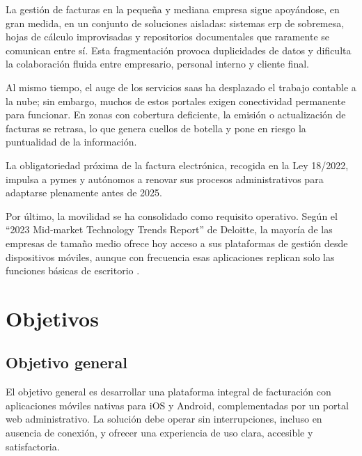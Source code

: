 \begin{large}

La gestión de facturas en la pequeña y mediana empresa sigue apoyándose, en gran medida, en un conjunto de soluciones aisladas: sistemas \gls{erp} de sobremesa, hojas de cálculo improvisadas y repositorios documentales que raramente se comunican entre sí. Esta fragmentación provoca duplicidades de datos y dificulta la colaboración fluida entre empresario, personal interno y cliente final.

Al mismo tiempo, el auge de los servicios \gls{saas} ha desplazado el trabajo contable a la nube; sin embargo, muchos de estos portales exigen conectividad permanente para funcionar. En zonas con cobertura deficiente, la emisión o actualización de facturas se retrasa, lo que genera cuellos de botella y pone en riesgo la puntualidad de la información.

La obligatoriedad próxima de la factura electrónica, recogida en la Ley 18/2022, impulsa a pymes y autónomos a renovar sus procesos administrativos para adaptarse plenamente antes de 2025.

Por último, la movilidad se ha consolidado como requisito operativo. Según el \enquote{2023 Mid‐market Technology Trends Report} de Deloitte, la mayoría de las empresas de tamaño medio ofrece hoy acceso a sus plataformas de gestión desde dispositivos móviles, aunque con frecuencia esas aplicaciones replican solo las funciones básicas de escritorio \cite{estudio_movilidad}.

\end{large}

\section{Objetivos}

\subsection{Objetivo general}

\begin{large}

El objetivo general es desarrollar una plataforma integral de facturación con aplicaciones móviles nativas para iOS y Android, complementadas por un portal web administrativo. La solución debe operar sin interrupciones, incluso en ausencia de conexión, y ofrecer una experiencia de uso clara, accesible y satisfactoria.

\end{large}

